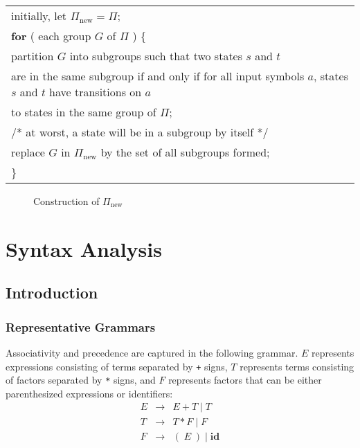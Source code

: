 \documentclass[a4paper,twoside]{book}
\begin{document}
\begin{center}
    \begin{tabular}{l}
        initially, let $\Pi_{\text{new}}=\Pi$;\\
        \textbf{for} ( each group $G$ of $\Pi$ ) \{\\
        \qquad partition $G$ into subgroups such that two states $s$ and $t$\\
        \qquad\qquad are in the same subgroup if and only if for all input symbols $a$, states $s$ and $t$ have transitions on $a$\\
        \qquad\qquad to states in the same group of $\Pi$;\\
        \qquad/* at worst, a state will be in a subgroup by itself */\\
        \qquad replace $G$ in $\Pi_{\text{new}}$ by the set of all subgroups formed;\\
        \}
    \end{tabular}
\end{center}
\begin{figure}[htbp]
    \caption{Construction of $\Pi_{\text{new}}$}
    \label{Figure:3.64}
\end{figure}

\chapter{Syntax Analysis}
\section{Introduction}
\subsection{Representative Grammars}

Associativity and precedence are captured in the following grammar. $E$ represents expressions consisting of terms separated by \verb|+| signs, $T$ represents terms consisting of factors separated by \verb|*| signs, and $F$ represents factors that can be either parenthesized expressions or identifiers:
\begin{equation}
    \begin{array}{ccc}E&\rightarrow&E+T\;|\;T\\T&\rightarrow&T*F\;|\;F\\F&\rightarrow&(\;E\;)\;|\;\textbf{id}\end{array}
    \label{4.1}
\end{equation}
\end{document}
